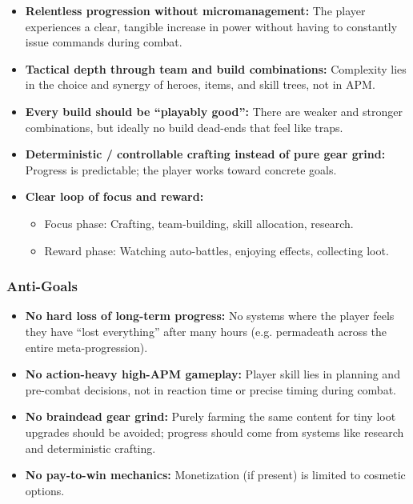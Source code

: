 \begin{itemize}
	\item \textbf{Relentless progression without micromanagement:} The player experiences a clear, tangible increase in power without having to constantly issue commands during combat.
	\item \textbf{Tactical depth through team and build combinations:} Complexity lies in the choice and synergy of heroes, items, and skill trees, not in APM.
	\item \textbf{Every build should be “playably good”:} There are weaker and stronger combinations, but ideally no build dead-ends that feel like traps.
	\item \textbf{Deterministic / controllable crafting instead of pure gear grind:} Progress is predictable; the player works toward concrete goals.
	\item \textbf{Clear loop of focus and reward:} 
	\begin{itemize}
		\item Focus phase: Crafting, team-building, skill allocation, research.
		\item Reward phase: Watching auto-battles, enjoying effects, collecting loot.
	\end{itemize}
\end{itemize}

\subsubsection*{Anti-Goals}

\begin{itemize}
	\item \textbf{No hard loss of long-term progress:} No systems where the player feels they have “lost everything” after many hours (e.g. permadeath across the entire meta-progression).
	\item \textbf{No action-heavy high-APM gameplay:} Player skill lies in planning and pre-combat decisions, not in reaction time or precise timing during combat.
	\item \textbf{No braindead gear grind:} Purely farming the same content for tiny loot upgrades should be avoided; progress should come from systems like research and deterministic crafting.
	\item \textbf{No pay-to-win mechanics:} Monetization (if present) is limited to cosmetic options.
\end{itemize}


